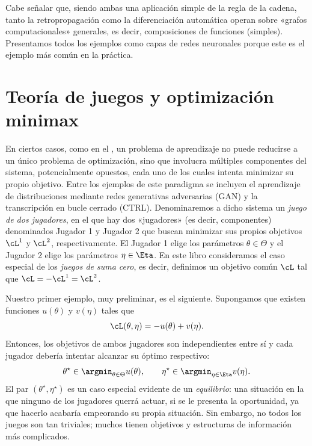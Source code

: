 \documentclass[../../book-main_es.tex]{subfiles}
\begin{document}
Cabe señalar que, siendo ambas una aplicación simple de la regla de la cadena, tanto la retropropagación
como la diferenciación automática operan sobre «grafos computacionales» generales,
es decir, composiciones de funciones (simples). Presentamos todos los
ejemplos como capas de redes neuronales porque este es el ejemplo más común
en la práctica.

\section{Teoría de juegos y optimización minimax}
\label{sec:minimax}\label{sec:game_theory}

En ciertos casos, como en el , un problema de aprendizaje
no puede reducirse a un único problema de optimización, sino que
involucra múltiples componentes del sistema, potencialmente opuestos, cada uno de los cuales intenta
minimizar su propio objetivo. Entre los ejemplos de este paradigma
se incluyen el aprendizaje de distribuciones mediante redes generativas adversarias
(GAN) y la transcripción en bucle cerrado (CTRL). Denominaremos a dicho
sistema un \textit{juego de dos jugadores}, en el que hay dos «jugadores»
(es decir, componentes) denominados Jugador 1 y Jugador 2 que buscan minimizar
sus propios objetivos \(\cL^{1}\) y \(\cL^{2}\), respectivamente. El Jugador 1
elige los parámetros \(\theta \in \Theta\) y el Jugador 2 elige los parámetros
\(\eta \in \Eta\). En este libro consideramos el caso especial de los
\textit{juegos de suma cero}, es decir, definimos un objetivo común \(\cL\)
tal que \(\cL = -\cL^{1} = \cL^{2}\).

Nuestro primer ejemplo, muy preliminar, es el siguiente. Supongamos que
existen funciones \(u(\theta)\) y \(v(\eta)\) tales que
\begin{equation}
    \cL(\theta, \eta) = -u(\theta) + v(\eta).
\end{equation}
Entonces, los objetivos de ambos jugadores son independientes entre sí
y cada jugador debería intentar alcanzar su óptimo respectivo:
\begin{equation}
    \theta^{\star} \in \argmin_{\theta \in \Theta}u(\theta), \qquad
    \eta^{\star} \in \argmin_{\eta \in \Eta}v(\eta).
\end{equation}
El par \((\theta^{\star}, \eta^{\star})\) es un caso especial
evidente de un \textit{equilibrio}: una situación en la que ninguno de los
jugadores querrá actuar, si se le presenta la oportunidad, ya que hacerlo acabaría
empeorando su propia situación. Sin embargo, no todos los juegos son tan
triviales; muchos tienen objetivos y estructuras de información más complicados.
\end{document}

